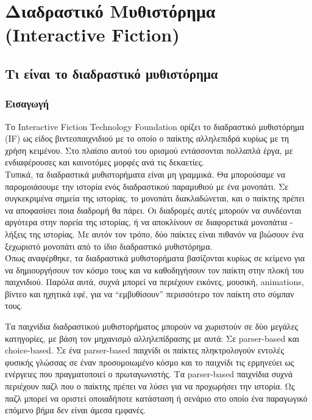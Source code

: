 \section{Διαδραστικό Μυθιστόρημα (Interactive Fiction)}\label{sec:chapter2}

\subsection{Τι είναι το διαδραστικό μυθιστόρημα}
\subsubsection{Εισαγωγή}
\noindent
Το Interactive Fiction Technology Foundation ορίζει το διαδραστικό μυθιστόρημα (IF) ως είδος βιντεοπαιχνιδιού με το οποίο ο παίκτης αλληλεπιδρά κυρίως με τη χρήση κειμένου. Στο πλαίσιο αυτού του ορισμού εντάσσονται πολλαπλά έργα, με ενδιαφέρουσες και καινοτόμες μορφές ανά τις δεκαετίες. \\

\noindent
Τυπικά, τα διαδραστικά μυθιστορήματα είναι μη γραμμικά. Θα μπορούσαμε να παρομοιάσουμε την ιστορία ενός διαδραστικού παραμυθιού με ένα μονοπάτι. Σε συγκεκριμένα σημεία της ιστορίας, το μονοπάτι διακλαδώνεται, και ο παίκτης πρέπει να αποφασίσει ποια διαδρομή θα πάρει. Οι διαδρομές αυτές μπορούν να συνδέονται αργότερα στην πορεία της ιστορίας, ή να αποκλίνουν σε διαφορετικά μονοπάτια - λήξεις της ιστορίας. Με αυτόν τον τρόπο, δύο παίκτες είναι πιθανόν να βιώσουν ένα ξεχωριστό μονοπάτι από το ίδιο διαδραστικό μυθιστόρημα.\\

\noindent
Όπως αναφέρθηκε, τα διαδραστικά μυθιστορήματα βασίζονται κυρίως σε κείμενο για να δημιουργήσουν τον κόσμο τους και να καθοδηγήσουν τον παίκτη στην πλοκή του παιχνιδιού. Παρόλα αυτά, συχνά μπορεί να περιέχουν εικόνες, μουσική, animations, βίντεο και ηχητικά εφέ, για να “εμβυθίσουν” περισσότερο τον παίκτη στο σύμπαν τους.

\noindent
Τα παιχνίδια διαδραστικού μυθιστορήματος μπορούν να χωριστούν σε δύο μεγάλες κατηγορίες, με βάση τον μηχανισμό αλληλεπίδρασης με αυτά: Σε parser-based και choice-based. Σε ένα parser-based παιχνίδι οι παίκτες πληκτρολογούν εντολές φυσικής γλώσσας σε έναν προσομοιωμένο κόσμο και το παιχνίδι τις ερμηνεύει ως ενέργειες που πραγματοποιεί ο πρωταγωνιστής. Τα parser-based παιχνίδια συχνά περιέχουν παζλ που ο παίκτης πρέπει να λύσει για να προχωρήσει την ιστορία. Ως παζλ μπορεί να οριστεί οποιαδήποτε κατάσταση ή σενάριο στο οποίο ένα παραγωγικό επόμενο βήμα δεν είναι άμεσα εμφανές.\\

